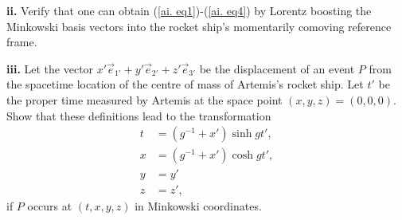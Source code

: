 \documentclass[a4paper]{article} %
\begin{document}
\begin{framed}
\textbf{ii.} 
Verify that one can obtain (\ref{ai. eq1})-(\ref{ai. eq4}) by Lorentz boosting the Minkowski basis vectors into the rocket ship’s momentarily comoving reference frame.
\end{framed}

\begin{framed}
\textbf{iii.} 
Let the vector $x'\vec{e}_{1'}+y'\vec{e}_{2'}+z'\vec{e}_{3'}$ be the displacement of an event $P$ from the spacetime location of the centre of mass of Artemis’s rocket ship. Let $t'$ be the proper time measured by Artemis at the space point $(x,y,z)=(0,0,0)$. Show that these definitions lead to the transformation
\begin{align}
t&=(g^{-1}+x')\sinh gt',\\
x&=(g^{-1}+x') \cosh gt',\\
y&=y'\\
z&=z',
\end{align}
if $P$ occurs at $(t,x,y,z)$ in Minkowski coordinates.
\end{framed}
\end{document}
